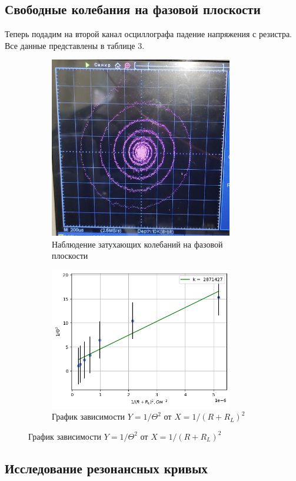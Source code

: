 \subsection*{Свободные колебания на фазовой плоскости}
Теперь подадим на второй канал осциллографа падение напряжения с резистра. Все данные представлены в таблице 3.
\newpage
\begin{figure}[h!]
    \begin{subfigure}{0.43\linewidth}
    \centering
    \includegraphics[width=8cm]{images/spiral.jpg}
    \caption{Наблюдение затухающих колебаний на фазовой плоскости}
    \end{subfigure}
    \hfill
    \begin{subfigure}{0.55\linewidth}
    \centering
    \includegraphics[width=8cm]{images/plot3.png}
    \caption{График зависимости $Y = 1 / \Theta^2 \text{ от } X = 1 /  (R + R_L)^2$}
    \end{subfigure}
\end{figure}

\subsection*{Исследование резонансных кривых}

